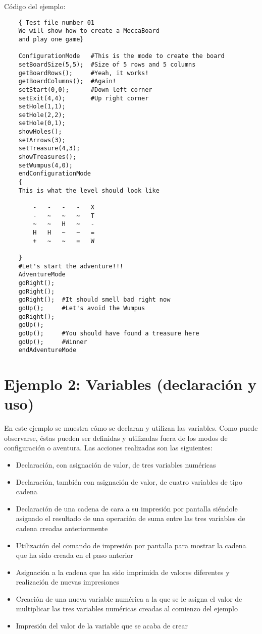 \documentclass[a4paper,12pt,twoside,openright]{report}
\begin{document}
  Código del ejemplo:
  \begin{lstlisting}
    { Test file number 01
    We will show how to create a MeccaBoard 
    and play one game}

    ConfigurationMode   #This is the mode to create the board
    setBoardSize(5,5);  #Size of 5 rows and 5 columns
    getBoardRows();     #Yeah, it works!
    getBoardColumns();  #Again!
    setStart(0,0);      #Down left corner
    setExit(4,4);	    #Up right corner
    setHole(1,1);	    
    setHole(2,2);
    setHole(0,1);
    showHoles();
    setArrows(3);
    setTreasure(4,3);
    showTreasures();
    setWumpus(4,0);
    endConfigurationMode
    {
    This is what the level should look like

	    -	-	-	-	X
	    -	~	~	~	T
	    ~	~	H	~	-
	    H	H	~	~	=
	    +	~	~	=	W

    }
    #Let's start the adventure!!!
    AdventureMode
    goRight();
    goRight();
    goRight();	#It should smell bad right now
    goUp();		#Let's avoid the Wumpus
    goRight();
    goUp();
    goUp();		#You should have found a treasure here
    goUp();		#Winner
    endAdventureMode
  \end{lstlisting}
  
  \section{Ejemplo 2: Variables (declaración y uso)}
  En este ejemplo se muestra cómo se declaran y utilizan las variables. Como puede observarse, éstas pueden ser 
  definidas y utilizadas fuera de los modos de configuración o aventura. Las acciones realizadas son las siguientes:
  \begin{itemize}
   \item Declaración, con asignación de valor, de tres variables numéricas
   \item Declaración, también con asignación de valor, de cuatro variables de tipo cadena
   \item Declaración de una cadena de cara a su impresión por pantalla siéndole asignado el resultado de una operación 
   de suma entre las tres variables de cadena creadas anteriormente
   \item Utilización del comando de impresión por pantalla para mostrar la cadena que ha sido creada en el paso anterior
   \item Asignación a la cadena que ha sido imprimida de valores diferentes y realización de nuevas impresiones
   \item Creación de una nueva variable numérica a la que se le asigna el valor de multiplicar las tres variables numéricas 
   creadas al comienzo del ejemplo
   \item Impresión del valor de la variable que se acaba de crear
  \end{itemize}
\end{document}
